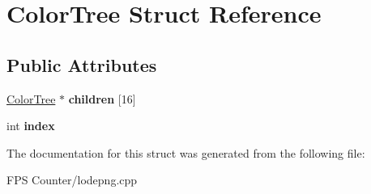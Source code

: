 \hypertarget{struct_color_tree}{}\section{Color\+Tree Struct Reference}
\label{struct_color_tree}
\subsection*{Public Attributes}
\begin{DoxyCompactItemize}
\item 
\mbox{\label{struct_color_tree_a46a3b1d9239f5fd467ec97cd067b9a96}} 
\mbox{\hyperlink{struct_color_tree}{Color\+Tree}} $\ast$ {\bfseries children} \mbox{[}16\mbox{]}
\item 
\mbox{\label{struct_color_tree_ab3836a4a5981a7cf4ef553d25d9b0361}} 
int {\bfseries index}
\end{DoxyCompactItemize}


The documentation for this struct was generated from the following file\+:\begin{DoxyCompactItemize}
\item 
F\+P\+S Counter/lodepng.\+cpp\end{DoxyCompactItemize}

